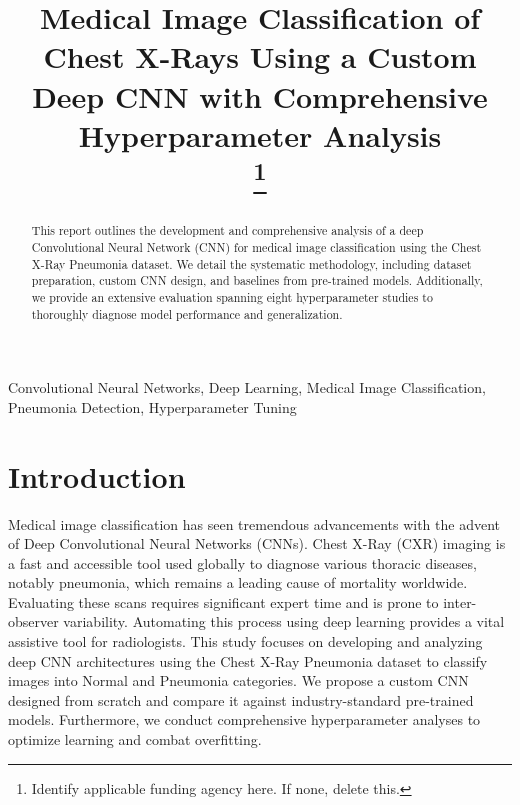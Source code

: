 \documentclass[conference]{IEEEtran}
\begin{document}
\title{Medical Image Classification of Chest X-Rays Using a Custom Deep CNN with Comprehensive Hyperparameter Analysis\\
\thanks{Identify applicable funding agency here. If none, delete this.}
}

\author{
}

\maketitle

\begin{abstract}
This report outlines the development and comprehensive analysis of a deep Convolutional Neural Network (CNN) for medical image classification using the Chest X-Ray Pneumonia dataset. We detail the systematic methodology, including dataset preparation, custom CNN design, and baselines from pre-trained models. Additionally, we provide an extensive evaluation spanning eight hyperparameter studies to thoroughly diagnose model performance and generalization.
\end{abstract}

\begin{IEEEkeywords}
Convolutional Neural Networks, Deep Learning, Medical Image Classification, Pneumonia Detection, Hyperparameter Tuning
\end{IEEEkeywords}

\section{Introduction}
Medical image classification has seen tremendous advancements with the advent of Deep Convolutional Neural Networks (CNNs). Chest X-Ray (CXR) imaging is a fast and accessible tool used globally to diagnose various thoracic diseases, notably pneumonia, which remains a leading cause of mortality worldwide. Evaluating these scans requires significant expert time and is prone to inter-observer variability. Automating this process using deep learning provides a vital assistive tool for radiologists. This study focuses on developing and analyzing deep CNN architectures using the Chest X-Ray Pneumonia dataset to classify images into Normal and Pneumonia categories. We propose a custom CNN designed from scratch and compare it against industry-standard pre-trained models. Furthermore, we conduct comprehensive hyperparameter analyses to optimize learning and combat overfitting.
\end{document}
